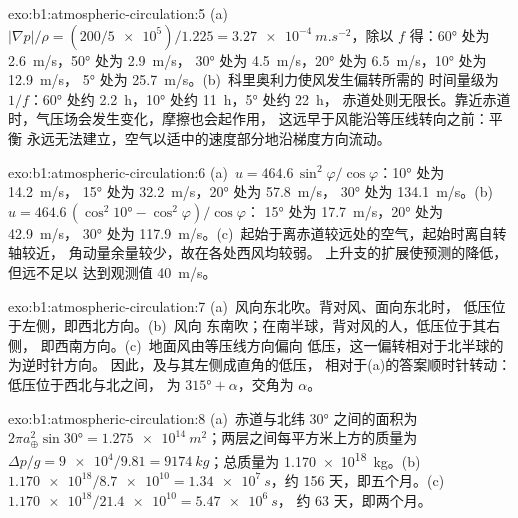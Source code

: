 \begin{solution}{exo:b1:atmospheric-circulation:5}
(a)~$|\nabla p|/\rho = (200/\num{5e5})/1.225 = \qty{3.27e-4}{m.s^{-2}}$，除以
$f$ 得：\ang{60} 处为 \qty{2.6}{m/s}，\ang{50} 处为 \qty{2.9}{m/s}，
\ang{30} 处为 \qty{4.5}{m/s}，\ang{20} 处为 \qty{6.5}{m/s}，\ang{10} 处为 \qty{12.9}{m/s}，
\ang{5} 处为 \qty{25.7}{m/s}。(b)~科里奥利力使风发生偏转所需的
时间量级为 $1/f$：\ang{60} 处约 \qty{2.2}{h}，\ang{10} 处约 \qty{11}{h}，\ang{5} 处约 \qty{22}{h}，
赤道处则无限长。靠近赤道时，气压场会发生变化，摩擦也会起作用，
这远早于风能沿等压线转向之前：平衡
永远无法建立，空气以适中的速度部分地沿梯度方向流动。
\end{solution}

\begin{solution}{exo:b1:atmospheric-circulation:6}
(a)~$u = 464.6\,\sin^2\varphi/\cos\varphi$：\ang{10} 处为 \qty{14.2}{m/s}，
\ang{15} 处为 \qty{32.2}{m/s}，\ang{20} 处为 \qty{57.8}{m/s}，
\ang{30} 处为 \qty{134.1}{m/s}。(b)~$u = 464.6\,(\cos^2\ang{10} - \cos^2\varphi)/\cos\varphi$：
\ang{15} 处为 \qty{17.7}{m/s}，\ang{20} 处为 \qty{42.9}{m/s}，
\ang{30} 处为 \qty{117.9}{m/s}。(c)~起始于离赤道较远处的空气，起始时离自转轴较近，
角动量余量较少，故在各处西风均较弱。
上升支的扩展使预测的降低，但远不足以
达到观测值 \qty{40}{m/s}。
\end{solution}

\begin{solution}{exo:b1:atmospheric-circulation:7}
(a)~风向东北吹。背对风、面向东北时，
低压位于左侧，即西北方向。(b)~风向
东南吹；在南半球，背对风的人，低压位于其右侧，
即西南方向。(c)~地面风由等压线方向偏向
低压，这一偏转相对于北半球的为逆时针方向。
因此，及与其左侧成直角的低压，
相对于(a)的答案顺时针转动：低压位于西北与北之间，
为 $\ang{315} + \alpha$，交角为
$\alpha$。
\end{solution}

\begin{solution}{exo:b1:atmospheric-circulation:8}
(a)~赤道与北纬 \ang{30} 之间的面积为 $2\pi a_\oplus^2\sin\ang{30} =
\qty{1.275e14}{m^2}$；两层之间每平方米上方的质量为
$\Delta p/g = \num{9e4}/9.81 = \qty{9174}{kg}$；总质量为
\qty{1.170e18}{kg}。(b)~$\num{1.170e18}/\num{8.7e10} = \qty{1.34e7}{s}$，约
\num{156} 天，即五个月。(c)~$\num{1.170e18}/\num{21.4e10} = \qty{5.47e6}{s}$，
约 \num{63} 天，即两个月。
\end{solution}

